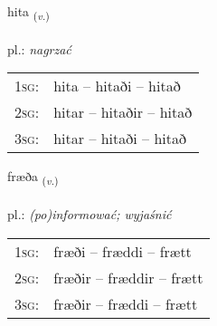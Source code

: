 \documentclass[frontgrid, backgrid]{flacards}\usepackage[]{graphicx}\usepackage[]{xcolor}
\begin{document}
\renewcommand{\blhead}{\vskip5pt {\small\bfseries\footnotesize Sagnorð | czasownik }}
\renewcommand{\bcfoot}{\vskip5pt \hspace{2pt}{\small\bfseries\footnotesize 3K}}


{hita \small{\textsubscript{(\textit{v.})}} \\[1ex] %
\textphonetic{[hɪːta]} \\
pl.: \emph{nagrzać} \\  [2ex]
\renewcommand*{\arraystretch}{0.8}
\begin{tabular}{p{1cm}l}
\textsc{1sg}: & hita -- hitaði -- hitað \\ 
\textsc{2sg}: & hitar -- hitaðir -- hitað \\ 
\textsc{3sg}: & hitar -- hitaði -- hitað \\ 
\end{tabular}
}

\renewcommand{\flhead}{\vskip5pt \fboxsep=0pt {\small\bfseries\footnotesize Sagnorð | czasownik}}
\renewcommand{\fcfoot}{\vskip5pt \fboxsep=0pt \hspace{2pt}{\small\bfseries\footnotesize 3K}}

\renewcommand{\blhead}{\vskip5pt {\small\bfseries\footnotesize Sagnorð | czasownik }}
\renewcommand{\bcfoot}{\vskip5pt \hspace{2pt}{\small\bfseries\footnotesize 3K}}


{fræða \small{\textsubscript{(\textit{v.})}} \\[1ex] %
\textphonetic{[fraiːða]} \\
pl.: \emph{(po)informować; wyjaśnić} \\  [2ex]
\renewcommand*{\arraystretch}{0.8}
\begin{tabular}{p{1cm}l}
\textsc{1sg}: & fræði -- fræddi -- frætt \\ 
\textsc{2sg}: & fræðir -- fræddir -- frætt \\ 
\textsc{3sg}: & fræðir -- fræddi -- frætt \\ 
\end{tabular}
}
\end{document}
